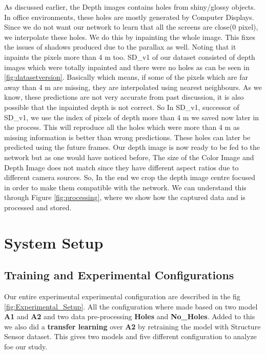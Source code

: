 As discussed earlier, the Depth images contains holes from shiny/glossy objects\cite{shiny}. In office environments, these holes are mostly generated by Computer Displays. Since we do not want our network to learn that all the screens are close(0 pixel), we interpolate these holes. We do this by inpainting \cite{inpainting} the whole image. This fixes the issues of shadows produced due to the parallax as well. Noting that it inpaints the pixels more than 4 m too. SD\_v1 of our dataset consisted of depth images which were totally inpainted and there were no holes as can be seen in \ref{fig:datasetversion}. Basically which means, if some of the pixels which are far away than 4 m are missing, they are interpolated using nearest neighbours. As we know, these predictions are not very accurate from past discussion, it is also possible that the inpainted depth is not correct. So In SD\_v1, successor of SD\_v1, we use the index of pixels of depth more than 4 m we saved now later in the process. This will reproduce all the holes which were more than 4 m as missing information is better than wrong predictions. These holes can later be predicted using the future frames. Our depth image is now ready to be fed to the network but as one would have noticed before, The size of the Color Image and Depth Image does not match since they have different aspect ratios due to different camera sources. So, In the end we crop the depth image centre focused in order to make them compatible with the network. We can understand this through Figure \ref{fig:processing}, where we show how the captured data and is processed and stored. \\



\newpage
\section{System Setup}
\label{Chapter5:Experimental_Setup}
\subsection{Training and Experimental Configurations}

 Our entire experimental experimental configuration are described in the fig \ref{fig:Experimental_Setup}. All the configuration where made based on two model \textbf{A1} and \textbf{A2} and two data pre-processing \textbf{Holes} and \textbf{No\_Holes}. Added to this we also did a \textbf{transfer learning} over \textbf{A2} by retraining the model with Structure Sensor dataset. This gives two models and five different configuration to analyze foe our study. 


